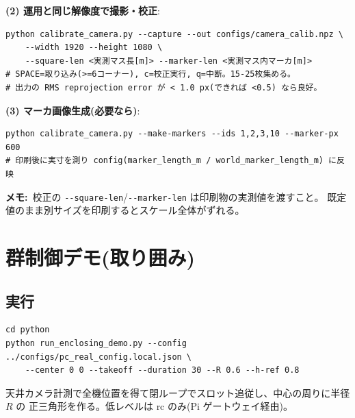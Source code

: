 \documentclass[11pt,a4paper]{ltjsarticle}
\newcommand{\code}[1]{\texttt{\small #1}}
\newcommand{\note}[1]{\par\smallskip\noindent\textbf{メモ:}~#1\par\smallskip}
\begin{document}
\textbf{(2) 運用と同じ解像度で撮影・校正}:
\begin{lstlisting}
python calibrate_camera.py --capture --out configs/camera_calib.npz \
    --width 1920 --height 1080 \
    --square-len <実測マス長[m]> --marker-len <実測マス内マーカ[m]>
# SPACE=取り込み(>=6コーナー), c=校正実行, q=中断。15-25枚集める。
# 出力の RMS reprojection error が < 1.0 px(できれば <0.5) なら良好。
\end{lstlisting}

\textbf{(3) マーカ画像生成(必要なら)}:
\begin{lstlisting}
python calibrate_camera.py --make-markers --ids 1,2,3,10 --marker-px 600
# 印刷後に実寸を測り config(marker_length_m / world_marker_length_m) に反映
\end{lstlisting}

\note{校正の \code{-{}-square-len}/\code{-{}-marker-len} は印刷物の実測値を渡すこと。
既定値のまま別サイズを印刷するとスケール全体がずれる。}

\section{群制御デモ(取り囲み)}

\subsection{実行}
\begin{lstlisting}
cd python
python run_enclosing_demo.py --config ../configs/pc_real_config.local.json \
    --center 0 0 --takeoff --duration 30 --R 0.6 --h-ref 0.8
\end{lstlisting}
天井カメラ計測で全機位置を得て閉ループでスロット追従し、中心の周りに半径 $R$ の
正三角形を作る。低レベルは rc のみ(Pi ゲートウェイ経由)。
\end{document}
